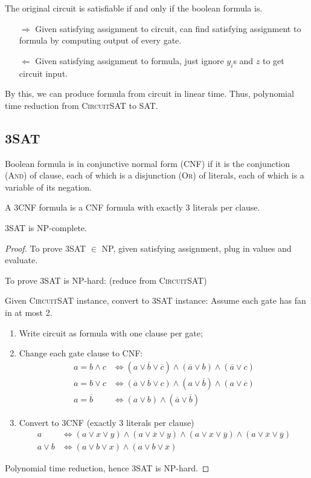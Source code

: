 The original circuit is satisfiable if and only if the boolean formula is.
\begin{itemize}[leftmargin=.75in]
    \item[$\Longrightarrow$] Given satisfying assignment to circuit, can find satisfying assignment to formula
        by computing output of every gate.
    \item[$\Longleftarrow$] Given satisfying assignment to formula, just ignore $y_i$s and $z$ to get circuit input.
\end{itemize}
By this, we can produce formula from circuit in linear time.
Thus, polynomial time reduction from \textsc{CircuitSAT} to SAT.

\subsection{3SAT}
Boolean formula is in conjunctive normal form (CNF) if it is the
conjunction (\textsc{And}) of clause,
each of which is a disjunction (\textsc{Or}) of literals,
each of which is a variable of its negation.

A 3CNF formula is a CNF formula with exactly 3 literals per clause.

\begin{theorem}
    3SAT is NP-complete.
\end{theorem}
\begin{proof}
To prove 3SAT $\in$ NP, given satisfying assignment, plug in values and evaluate.

To prove 3SAT is NP-hard: (reduce from \textsc{CircuitSAT})

Given \textsc{CircuitSAT} instance, convert to 3SAT instance:
Assume each gate has fan in at most 2.
\begin{enumerate}
    \item Write circuit as formula with one clause per gate;
    \item Change each gate clause to CNF:
        \begin{align*}
            a=b \land c &\Longleftrightarrow (a \lor \overline{b} \lor \overline{c}) \land
                (\overline{a} \lor b) \land (\overline{a} \lor c) \\
            a=b \lor c &\Longleftrightarrow (\overline{a} \lor b \lor c) \land
                (a \lor \overline{b}) \land (a \lor \overline{c}) \\
            a = \overline{b} &\Longleftrightarrow (a \lor b) \land (\overline{a} \lor \overline{b})
        \end{align*}
    \item Convert to 3CNF (exactly 3 literals per clause)
        \begin{align*}
            a &\Longleftrightarrow (a \lor x \lor y) \land (a \lor \overline{x} \lor y) \land
                (a \lor x \lor \overline{y}) \land (a \lor \overline{x} \lor \overline{y}) \\
            a \lor b &\Longleftrightarrow (a \lor b \lor x) \land (a \lor b \lor \overline{x})
        \end{align*}
\end{enumerate}
Polynomial time reduction, hence 3SAT is NP-hard.
\end{proof}


